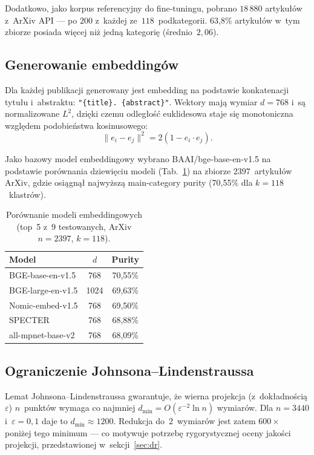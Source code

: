 \documentclass[a4paper,11pt,twocolumn]{article}
\begin{document}
Dodatkowo, jako korpus referencyjny do fine-tuningu, pobrano $18\,880$
artykułów z~ArXiv API --- po $200$ z~każdej ze~$118$~podkategorii.
63,8\% artykułów w~tym zbiorze posiada więcej niż jedną kategorię
(średnio~$2{,}06$).

\subsection{Generowanie embeddingów}

Dla każdej publikacji generowany jest embedding na podstawie konkatenacji
tytułu i~abstraktu: \texttt{"\{title\}. \{abstract\}"}. Wektory mają
wymiar $d=768$ i~są normalizowane $L^2$, dzięki czemu odległość
euklidesowa staje się monotoniczna względem podobieństwa kosinusowego:
\begin{equation}
  \|e_i - e_j\|^2 = 2(1 - e_i \cdot e_j).
  \label{eq:cosine}
\end{equation}

Jako bazowy model embeddingowy wybrano BAAI/bge-base-en-v1.5 na podstawie
porównania dziewięciu modeli (Tab.~\ref{tab:models}) na zbiorze
$2397$~artykułów ArXiv, gdzie osiągnął najwyższą main-category purity
(70,55\% dla $k=118$~klastrów).

\begin{table}[t]
\centering
\caption{Porównanie modeli embeddingowych (top~5 z~9 testowanych,
ArXiv $n=2397$, $k=118$).}
\label{tab:models}
\small
\begin{tabular}{@{}lcc@{}}
\toprule
Model & $d$ & Purity \\
\midrule
BGE-base-en-v1.5    & 768  & 70,55\% \\
BGE-large-en-v1.5   & 1024 & 69,63\% \\
Nomic-embed-v1.5    & 768  & 69,50\% \\
SPECTER             & 768  & 68,88\% \\
all-mpnet-base-v2   & 768  & 68,09\% \\
\bottomrule
\end{tabular}
\end{table}

\subsection{Ograniczenie Johnsona--Lindenstraussa}

Lemat Johnsona--Lindenstraussa gwarantuje, że wierna projekcja
(z~dokładnością $\varepsilon$) $n$~punktów wymaga co najmniej
$d_{\min} = O(\varepsilon^{-2} \ln n)$ wymiarów. Dla $n=3440$
i~$\varepsilon=0{,}1$ daje to $d_{\min} \approx 1200$. Redukcja
do~$2$~wymiarów jest zatem $600\times$ poniżej tego minimum ---
co motywuje potrzebę rygorystycznej oceny jakości projekcji,
przedstawionej w~sekcji~\ref{sec:dr}.
\end{document}
